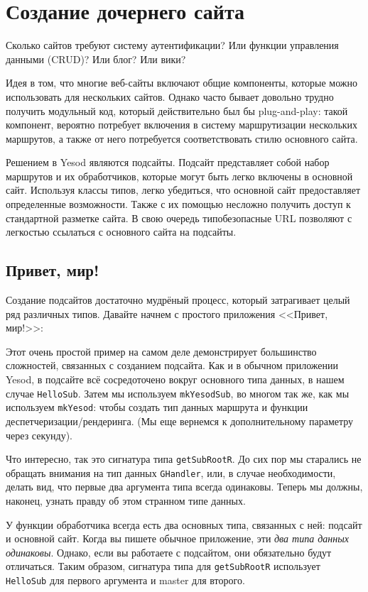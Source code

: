 \chapter{Создание дочернего сайта}\label{chap:subsite}

Сколько сайтов требуют систему аутентификации? Или функции управления данными (CRUD)? Или блог? Или вики?

Идея в том, что многие веб-сайты включают общие компоненты, которые можно использовать для нескольких сайтов. Однако часто бывает довольно трудно получить модульный код, который действительно был бы plug-and-play: такой компонент, вероятно потребует включения в систему маршрутизации нескольких маршрутов, а также от него потребуется соответствовать стилю основного сайта.

Решением в Yesod являются подсайты. Подсайт представляет собой набор маршрутов и их обработчиков, которые могут быть легко включены в основной сайт. Используя классы типов, легко убедиться, что основной сайт предоставляет определенные возможности. Также с их помощью несложно получить доступ к стандартной разметке сайта. В свою очередь типобезопасные URL позволяют с легкостью ссылаться с основного сайта на подсайты.

\section{Привет, мир!}

Создание подсайтов достаточно мудрёный процесс, который затрагивает целый ряд различных типов. Давайте начнем с простого приложения <<Привет, мир!>>:

Этот очень простой пример на самом деле демонстрирует большинство сложностей, связанных с созданием подсайта. Как и в обычном приложении Yesod, в подсайте всё сосредоточено вокруг основного типа данных, в нашем случае \lstinline!HelloSub!. Затем мы используем \lstinline!mkYesodSub!, во многом так же, как мы используем \lstinline!mkYesod!: чтобы создать тип данных маршрута и функции деспетчеризации/рендеринга. (Мы еще вернемся к дополнительному параметру через секунду).

Что интересно, так это сигнатура типа \lstinline!getSubRootR!. До сих пор мы старались не обращать внимания на тип данных \lstinline!GHandler!, или, в случае необходимости, делать вид, что первые два аргумента типа всегда одинаковы. Теперь мы должны, наконец, узнать правду об этом странном типе данных.

У функции обработчика всегда есть два основных типа, связанных с ней: подсайт и основной сайт. Когда вы пишете обычное приложение, эти \emph{два типа данных одинаковы}.  Однако, если вы работаете с подсайтом, они обязательно будут отличаться. Таким образом, сигнатура типа для \lstinline!getSubRootR! использует \lstinline!HelloSub! для первого аргумента и master для второго.

